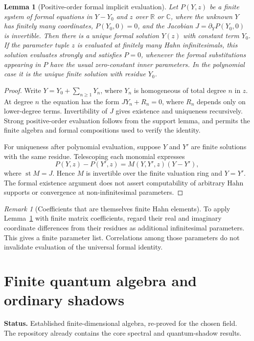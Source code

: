 \documentclass[11pt,oneside]{article}
\numberwithin{equation}{section}
\theoremstyle{plain}
\newtheorem{lemma}[theorem]{Lemma}
\theoremstyle{definition}
\theoremstyle{remark}
\newtheorem{remark}[theorem]{Remark}
\newcommand{\R}{\mathbb R}
\newcommand{\C}{\mathbb C}
\newcommand{\st}{\operatorname{st}}
\newcommand{\status}[1]{\par\noindent\textbf{Status.} #1\par}
\begin{document}
\begin{lemma}[Positive-order formal implicit evaluation]\label{lem:implicit}
Let $P(Y,z)$ be a finite system of formal equations in $Y-Y_0$ and $z$ over $\R$ or $\C$, where the unknown $Y$ has finitely many coordinates, $P(Y_0,0)=0$, and the Jacobian $J=\partial_Y P(Y_0,0)$ is invertible. Then there is a unique formal solution $Y(z)$ with constant term $Y_0$. If the parameter tuple $z$ is evaluated at finitely many Hahn infinitesimals, this solution evaluates strongly and satisfies $P=0$, whenever the formal substitutions appearing in $P$ have the usual zero-constant inner parameters. In the polynomial case it is the unique finite solution with residue $Y_0$.
\end{lemma}
\begin{proof}
Write $Y=Y_0+\sum_{n\ge1}Y_n$, where $Y_n$ is homogeneous of total degree $n$ in $z$. At degree $n$ the equation has the form $JY_n+R_n=0$, where $R_n$ depends only on lower-degree terms. Invertibility of $J$ gives existence and uniqueness recursively. Strong positive-order evaluation follows from the support lemma, and permits the finite algebra and formal compositions used to verify the identity.

For uniqueness after polynomial evaluation, suppose $Y$ and $Y'$ are finite solutions with the same residue. Telescoping each monomial expresses
\[
 P(Y,z)-P(Y',z)=M(Y,Y',z)(Y-Y'),
\]
where $\st M=J$. Hence $M$ is invertible over the finite valuation ring and $Y=Y'$. The formal existence argument does not assert computability of arbitrary Hahn supports or convergence at non-infinitesimal parameters.
\end{proof}

\begin{remark}[Coefficients that are themselves finite Hahn elements]
To apply Lemma~\ref{lem:implicit} with finite matrix coefficients, regard their real and imaginary coordinate differences from their residues as additional infinitesimal parameters. This gives a finite parameter list. Correlations among those parameters do not invalidate evaluation of the universal formal identity.
\end{remark}

\section{Finite quantum algebra and ordinary shadows}\label{sec:quantum}
\status{Established finite-dimensional algebra, re-proved for the chosen field. The repository already contains the core spectral and quantum-shadow results.}
\end{document}
